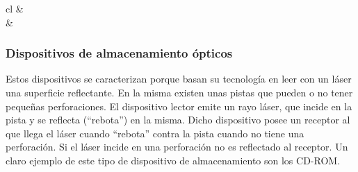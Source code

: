 \documentclass[10pt,journal]{IEEEtran}
\begin{document}
\begin{itemize}
\begin{table}[H]
\begin{tabular}{cl}
 &  \\ \hline
{} &  \\ \hline
\end{tabular}
\end{table}
\end{itemize}
\subsubsection{\textbf{Dispositivos de almacenamiento ópticos}} Estos dispositivos se caracterizan porque basan su tecnología en leer con un láser una superficie reflectante. En la misma existen unas pistas que pueden o no tener pequeñas perforaciones. El dispositivo lector emite un rayo láser, que incide en la pista y se reflecta (“rebota”) en la misma. Dicho dispositivo posee un receptor al que llega el láser cuando “rebota” contra la pista cuando no tiene una perforación. Si el láser incide en una perforación no es reflectado al receptor.\citep{montaje}
Un claro ejemplo de este tipo de dispositivo de almacenamiento son los CD-ROM.
\end{document}
